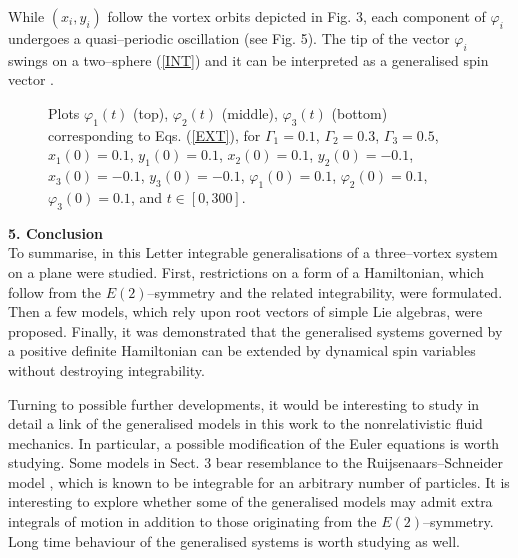 \documentclass[12pt]{article}
\begin{document}
While $(x_i,y_i)$ follow the vortex orbits depicted in Fig. 3, each component of $\varphi_i$ undergoes a quasi--periodic oscillation (see Fig. 5). The tip of the vector $\varphi_i$ swings on a two--sphere (\ref{INT}) and it can be interpreted as a generalised spin vector \cite{AG}.

\begin{figure}[ht]
\begin{center}
\vskip-4mm
\caption{\small Plots $\varphi_1(t)$ (top), $\varphi_2(t)$ (middle), $\varphi_3(t)$ (bottom) corresponding to Eqs. (\ref{EXT}), for $\Gamma_1=0.1$, $\Gamma_2=0.3$, $\Gamma_3=0.5$, $x_1(0)=0.1$, $y_1 (0)=0.1$, $x_2 (0)=0.1$, $y_2 (0)=-0.1$, $x_3 (0)=-0.1$, $y_3 (0)=-0.1$, $\varphi_1(0)=0.1$, $\varphi_2(0)=0.1$, $\varphi_3(0)=0.1$, and $t \in [0,300]$.}
\label{fig3}
\end{center}
\end{figure}

\vspace{0.5cm}

\noindent
{\bf 5. Conclusion}\\

\noindent
To summarise, in this Letter integrable generalisations of a three--vortex system on a plane were studied.
First, restrictions on a form of a Hamiltonian, which follow from the $E(2)$--symmetry and the related integrability, were formulated. Then a few models, which rely upon root vectors of simple Lie algebras, were proposed.
Finally, it was demonstrated that the generalised systems governed by a positive definite  Hamiltonian can be extended by dynamical spin variables without destroying integrability.

Turning to possible further developments, it would be interesting to study in detail a link of the generalised models in this work to the nonrelativistic fluid mechanics. In particular, a possible modification of the Euler equations is worth studying. Some models in Sect. 3 bear resemblance to the Ruijsenaars--Schneider model \cite{RS}, which is known to be integrable for an arbitrary number of particles. It is interesting to explore whether some of the generalised models may admit extra integrals of motion in addition to those originating from the $E(2)$--symmetry. Long time behaviour of the generalised systems is worth studying as well.

\vspace{0.5cm}
\end{document}
